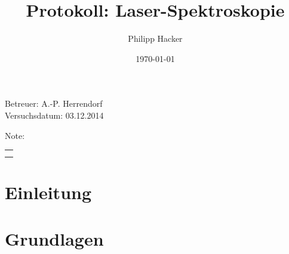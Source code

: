 \documentclass[numbers=noenddot,12pt,a4paper]{scrartcl}
\title{Protokoll: Laser-Spektroskopie} %
\author{Philipp Hacker} %
\date{\today}
\begin{document}
\maketitle
\begin{center}
Betreuer: A.-P. Herrendorf\\ %
Versuchsdatum: 03.12.2014\\ %
\begin{table}[h]
\centering
Note: %
\begin{tabularx}{1.5cm}{|X|}
\hline \\ \\
\hline
\end{tabularx}
\end{table}
\end{center}
\vspace*{\fill}
\tableofcontents
\vfill
\newpage
\section{Einleitung}
\section{Grundlagen}
\end{document}
